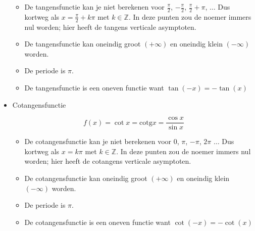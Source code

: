 \begin{itemize}
\begin{itemize}
	\item De tangensfunctie kan je niet berekenen voor $\frac{\pi}{2}$, $-\frac{\pi}{2}$,
	$\frac{\pi}{2}+\pi$, $\ldots$ Dus kortweg als $x=\frac{\pi}{2}+k\pi$
	met $k\in\mathbb{Z}$. In deze punten zou de noemer immers nul worden;
	hier heeft de tangens verticale asymptoten.
	\item De tangensfunctie kan oneindig groot $(+\infty)$ en oneindig klein
	$(-\infty)$ worden.
	\item De periode is $\pi$.
	\item De tangensfunctie is een oneven functie want $\tan(-x)=-\tan(x)$
\end{itemize}

\item{Cotangensfunctie}

\begin{equation*}
f(x)=\cot x=\textrm{cotg}x=\frac{\cos x}{\sin x}
\end{equation*}



\begin{itemize}
	\item De cotangensfunctie kan je niet berekenen voor $0$, $\pi$, $-\pi$,
	$2\pi$ $\ldots$ Dus kortweg als $x=k\pi$ met $k\in\mathbb{Z}$.
	In deze punten zou de noemer immers nul worden; hier heeft de cotangens
	verticale asymptoten.
	\item De cotangensfunctie kan oneindig groot $(+\infty)$ en oneindig klein
	$(-\infty)$ worden.
	\item De periode is $\pi$.
	\item De cotangensfunctie is een oneven functie want $\cot(-x)=-\cot(x)$
\end{itemize}

\end{itemize}

